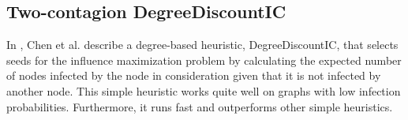 \documentclass[11pt]{article}
\begin{document}
    

    



\subsection{Two-contagion DegreeDiscountIC}
In \cite{DegreeDiscount}, Chen et al. describe a degree-based heuristic, DegreeDiscountIC, that selects seeds for the influence maximization problem by calculating the expected number of nodes infected by the node in consideration given that it is not infected by another node. This simple heuristic works quite well on graphs with low infection probabilities. Furthermore, it runs fast and outperforms other simple heuristics.
\end{document}
